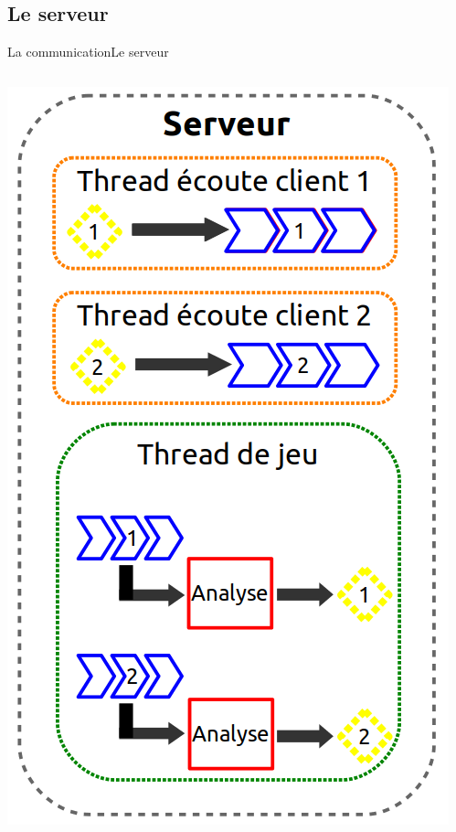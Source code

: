 \documentclass[french]{beamer}
\begin{document}
	\subsection{Le serveur}

	\begin{frame}{La communication}{Le serveur}
		\begin{columns}

			\begin{column}{0.4\textwidth}
				\begin{center}
					\includegraphics[scale=0.25]{img/serveur.png}
				\end{center}
			\end{column}



\end{columns}
\end{frame}
\end{document}
